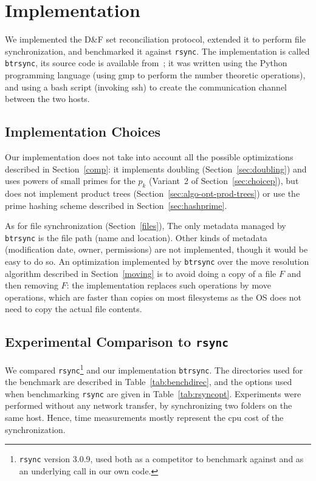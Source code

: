 \documentclass[11pt]{llncs}
\newcommand{\df}{D\&F\xspace}
\newcommand{\btrsync}{\texttt{btrsync}\xspace}
\newcommand{\rsync}{\texttt{rsync}\xspace}
\begin{document}
\section{Implementation}
\label{program}

We implemented the \df set reconciliation protocol, extended it to perform file
synchronization, and benchmarked it against \rsync. The implementation is called
\btrsync, its source code is available from~\cite{Robin}; it was written using
the Python programming language (using {\sf gmp} to perform the number theoretic
operations), and using a bash script (invoking ssh) to create the communication
channel between the two hosts.

\subsection{Implementation Choices}

Our implementation does not take into account all the possible optimizations
described in Section~\ref{comp}: it implements doubling
(Section~\ref{sec:doubling}) and uses powers of small primes for the $p_k$
(Variant~2 of Section~\ref{sec:choicep}), but does not implement product trees
(Section~\ref{sec:algo-opt-prod-trees}) or use the prime hashing scheme
described in Section~\ref{sec:hashprime}.

As for file synchronization (Section~\ref{files}), The only metadata managed by
\btrsync is the file path (name and location). Other kinds of metadata
(modification date, owner, permissions) are not implemented, though it would be
easy to do so. An optimization implemented by \btrsync over the move resolution algorithm described in Section~\ref{moving} is to avoid doing a copy of a file $F$ and then removing $F$: the implementation replaces such operations by move operations, which are faster than copies on most filesystems as the OS does not need to copy the actual file contents.

\subsection{Experimental Comparison to \rsync}

We compared \rsync\footnote{\rsync version 3.0.9, used both as a competitor to
benchmark against and as an underlying call in our own code.} and our implementation \btrsync. The directories used for the
benchmark are described in Table~\ref{tab:benchdirec}, and the options used
when benchmarking \rsync are given in Table~\ref{tab:rsyncopt}. Experiments
were performed without any network transfer, by synchronizing two folders on
the same host. Hence, time measurements mostly represent the {\sc cpu} cost of
the synchronization.
\end{document}
